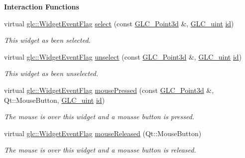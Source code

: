 \begin{Indent}{\bf Interaction Functions}\par
\begin{DoxyCompactItemize}
\item 
virtual \hyperlink{namespaceglc_a7a4a1e3955352aeb2d018746fbe626d5}{glc\-::\-Widget\-Event\-Flag} \hyperlink{class_g_l_c___cutting_plane_a3221df2707dc2a73043f33d4b1e8d20d}{select} (const \hyperlink{glc__vector3d_8h_a4e13a9bbc7ab3d34de7e98b41836772c}{G\-L\-C\-\_\-\-Point3d} \&, \hyperlink{glc__global_8h_abf950976fabed69026558df8e2da6c6b}{G\-L\-C\-\_\-uint} \hyperlink{glext_8h_a58c2a664503e14ffb8f21012aabff3e9}{id})
\begin{DoxyCompactList}\small\item\em This widget as been selected. \end{DoxyCompactList}\item 
virtual \hyperlink{namespaceglc_a7a4a1e3955352aeb2d018746fbe626d5}{glc\-::\-Widget\-Event\-Flag} \hyperlink{class_g_l_c___cutting_plane_a648e749bab772b7c000eefa7367ee66d}{unselect} (const \hyperlink{glc__vector3d_8h_a4e13a9bbc7ab3d34de7e98b41836772c}{G\-L\-C\-\_\-\-Point3d} \&, \hyperlink{glc__global_8h_abf950976fabed69026558df8e2da6c6b}{G\-L\-C\-\_\-uint} \hyperlink{glext_8h_a58c2a664503e14ffb8f21012aabff3e9}{id})
\begin{DoxyCompactList}\small\item\em This widget as been unselected. \end{DoxyCompactList}\item 
virtual \hyperlink{namespaceglc_a7a4a1e3955352aeb2d018746fbe626d5}{glc\-::\-Widget\-Event\-Flag} \hyperlink{class_g_l_c___cutting_plane_a7012c26e140ce1a41b026134d1fc11e2}{mouse\-Pressed} (const \hyperlink{glc__vector3d_8h_a4e13a9bbc7ab3d34de7e98b41836772c}{G\-L\-C\-\_\-\-Point3d} \&, Qt\-::\-Mouse\-Button, \hyperlink{glc__global_8h_abf950976fabed69026558df8e2da6c6b}{G\-L\-C\-\_\-uint} \hyperlink{glext_8h_a58c2a664503e14ffb8f21012aabff3e9}{id})
\begin{DoxyCompactList}\small\item\em The mouse is over this widget and a mousse button is pressed. \end{DoxyCompactList}\item 
virtual \hyperlink{namespaceglc_a7a4a1e3955352aeb2d018746fbe626d5}{glc\-::\-Widget\-Event\-Flag} \hyperlink{class_g_l_c___cutting_plane_aceae3cb58aa08ea45e0cb5a0dd368854}{mouse\-Released} (Qt\-::\-Mouse\-Button)
\begin{DoxyCompactList}\small\item\em The mouse is over this widget and a mousse button is released. \end{DoxyCompactList}\item 

\end{DoxyCompactItemize}
\end{Indent}
